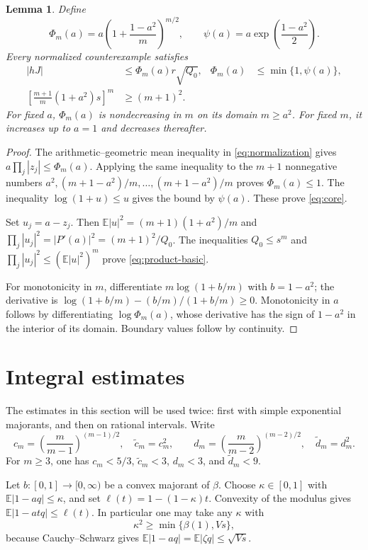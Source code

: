 \documentclass[11pt,reqno]{amsart}
\newtheorem{lem}[thm]{Lemma}
\theoremstyle{definition}
\theoremstyle{remark}
\numberwithin{equation}{section}
\newcommand{\E}{\mathbb E}
\begin{document}
\begin{lem}\label{lem:basic-product}
Define
\[
 \Phi_m(a)=a\left(1+\frac{1-a^2}{m}\right)^{m/2},
 \qquad \psi(a)=a\exp\left(\frac{1-a^2}{2}\right).
\]
Every normalized counterexample satisfies
\begin{align}
 |hJ|&\le\Phi_m(a)r\sqrt{Q_0},&
 \Phi_m(a)&\le\min\{1,\psi(a)\},\label{eq:core}\\
 \left[\frac{m+1}{m}(1+a^2)s\right]^m&\ge(m+1)^2.&\label{eq:product-basic}
\end{align}
For fixed $a$, $\Phi_m(a)$ is nondecreasing in $m$ on its domain $m\ge a^2$. For fixed $m$, it increases up to $a=1$ and decreases thereafter.
\end{lem}
\begin{proof}
The arithmetic--geometric mean inequality in \eqref{eq:normalization} gives
$a\prod_j|z_j|\le\Phi_m(a)$. Applying the same inequality to the $m+1$ nonnegative numbers $a^2,(m+1-a^2)/m,\ldots,(m+1-a^2)/m$ proves $\Phi_m(a)\le1$. The inequality $\log(1+u)\le u$ gives the bound by $\psi(a)$. These prove \eqref{eq:core}.

Set $u_j=a-z_j$. Then $\E|u|^2=(m+1)(1+a^2)/m$ and
$\prod_j|u_j|^2=|P'(a)|^2=(m+1)^2/Q_0$.
The inequalities $Q_0\le s^m$ and $\prod_j|u_j|^2\le(\E|u|^2)^m$ prove \eqref{eq:product-basic}.

For monotonicity in $m$, differentiate $m\log(1+b/m)$ with $b=1-a^2$; the derivative is $\log(1+b/m)-(b/m)/(1+b/m)\ge0$. Monotonicity in $a$ follows by differentiating $\log\Phi_m(a)$, whose derivative has the sign of $1-a^2$ in the interior of its domain. Boundary values follow by continuity.
\end{proof}

\section{Integral estimates}\label{sec:integral}

The estimates in this section will be used twice: first with simple exponential majorants, and then on rational intervals. Write
\begin{equation}\label{eq:constants}
 c_m=\left(\frac m{m-1}\right)^{(m-1)/2},\quad
 \widetilde c_m=c_m^2,\qquad
 d_m=\left(\frac m{m-2}\right)^{(m-2)/2},\quad
 \widetilde d_m=d_m^2.
\end{equation}
For $m\ge3$, one has $c_m<5/3$, $\widetilde c_m<3$, $d_m<3$, and $\widetilde d_m<9$.

Let $b:[0,1]\to[0,\infty)$ be a convex majorant of $\beta$. Choose $\kappa\in[0,1]$ with $\E|1-aq|\le\kappa$, and set $\ell(t)=1-(1-\kappa)t$. Convexity of the modulus gives $\E|1-atq|\le\ell(t)$. In particular one may take any $\kappa$ with
\begin{equation}\label{eq:kappa}
 \kappa^2\ge\min\{\beta(1),Vs\},
\end{equation}
because Cauchy--Schwarz gives $\E|1-aq|=\E|\zeta q|\le\sqrt{Vs}$.
\end{document}
